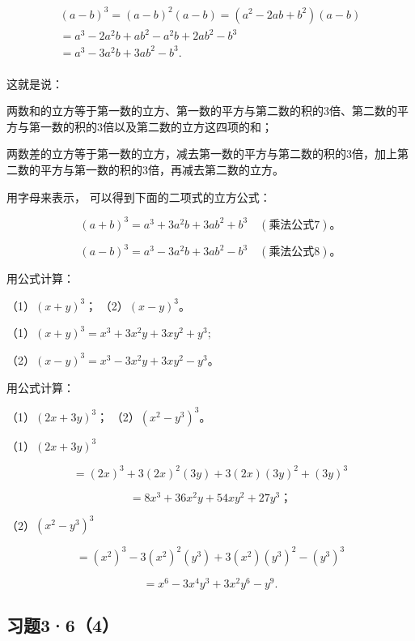 \[
\begin{array}{l} (a - b) ^{3} = (a - b) ^{2} (a - b) = (a ^{2} - 2 a b + b ^{2}) (a - b) \\ = a ^{3} - 2 a ^{2} b + a b ^{2} - a ^{2} b + 2 a b ^{2} - b ^{3} \\ = a ^{3} - 3 a ^{2} b + 3 a b ^{2} - b ^{3}. \\ \end{array}
\]

这就是说：

两数和的立方等于第一数的立方、第一数的平方与第二数的积的3倍、第二数的平方与第一数的积的3倍以及第二数的立方这四项的和；

两数差的立方等于第一数的立方，减去第一数的平方与第二数的积的3倍，加上第二数的平方与第一数的积的3倍，再减去第二数的立方。

用字母来表示， 可以得到下面的二项式的立方公式：

\[
(a + b) ^{3} = a ^{3} + 3 a ^{2} b + 3 a b ^{2} + b ^{3} \quad (\text{乘法公式7})\text{。}
\]

\[
(a - b) ^{3} = a ^{3} - 3 a ^{2} b + 3 a b ^{2} - b ^{3} \quad (\text{乘法公式8})\text{。}
\]

 用公式计算：

（1）\((x + y)^{3}\)； （2）\((x - y)^{3}\)。

（1）\((x + y)^{3} = x^{3} + 3x^{2}y + 3xy^{2} + y^{3};\)

（2）\((x - y)^{3} = x^{3} - 3x^{2}y + 3xy^{2} - y^{3}\)。

 用公式计算：

（1）\((2x + 3y)^{3}\)； （2）\((x^{2} - y^{3})^{3}\)。

 （1）\((2x + 3y)^{3}\)

\[
= (2 x) ^{3} + 3 (2 x) ^{2} (3 y) + 3 (2 x) (3 y) ^{2} + (3 y) ^{3}
\]

\[
= 8 x ^{3} + 36 x ^{2} y + 54 x y ^{2} + 27 y ^{3}\text{；}
\]

（2）\((x^{2} - y^{3})^{3}\)

\[
= (x ^{2}) ^{3} - 3 (x ^{2}) ^{2} (y ^{3}) + 3 (x ^{2}) (y ^{3}) ^{2} - (y ^{3}) ^{3}
\]

\[
= x ^{6} - 3 x ^{4} y ^{3} + 3 x ^{2} y ^{6} - y ^{9}.
\]

\subsection{习题3·6（4）}


